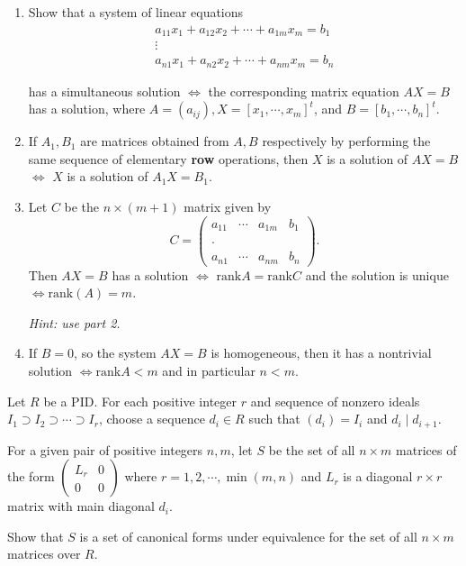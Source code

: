 \begin{problem}[Hungerford 7.2.4]
\label{prob:1.1}
\hfill
\begin{enumerate}
    \item Show that a system of linear equations
$$
\begin{array}{l}{
a_{11} x_{1}+a_{12} x_{2}+\cdots+a_{1 m} x_{m}=b_{1}} 
\\ 
\vdots 
\\ 
{a_{n 1} x_{1}+a_{n 2} x_{2}+\cdots+a_{n m} x_{m}=b_{n}}
\end{array}
$$

has a simultaneous solution $\iff$ the corresponding matrix equation $AX = B$ has a solution, where $A = (a_{ij}), X = [x_1, \cdots, x_m]^t$, and $B = [b_1, \cdots , b_n]^t$.

    \item If $A_1, B_1$ are matrices obtained from $A, B$ respectively by performing the same sequence of elementary \textbf{row} operations, then $X$ is a solution of $AX=B$ $\iff$ $X$ is a solution of $A_1 X = B_1$.
    
    \item Let $C$ be the $n \times (m+1)$ matrix given by 
    $$
    C = \left(\begin{array}{llll}{a_{11}} & {\cdots} & {a_{1 m}} & {b_{1}} \\ {} & {} & {} \\ {\cdot} & {} & {} \\ {a_{n 1}} & {\cdots} & {a_{n m}} & {b_{n}}\end{array}\right).
    $$
    Then $AX = B$ has a solution $\iff$ $\mathrm{rank} A = \mathrm{rank} C$ and the solution is unique $\iff \mathrm{rank}(A) = m$.
    
    \textit{Hint: use part 2.}
    
  \item If $B=0$, so the system $AX=B$ is homogeneous, then it has a nontrivial solution $\iff \mathrm{rank} A < m$ and in particular $n<m$.
\end{enumerate}

\end{problem}

\begin{problem}[Hungerford 7.2.5]
\label{prob:1.1}
Let $R$ be a PID. For each positive integer $r$ and sequence of nonzero ideals $I_1 \supset I_2 \supset \cdots \supset I_r$, choose a sequence $d_i \in R$ such that $(d_i) = I_i$ and $d_i \mid d_{i+1}$.

For a given pair of positive integers $n, m$, let $S$ be the set of all $n\times m$ matrices of the form $\left(\begin{array}{ll}{L_{r}} & {0} \\ {0} & {0}\end{array}\right)$ where $r=1,2,\cdots,\min(m,n)$ and $L_r$ is a diagonal $r\times r$ matrix with main diagonal $d_i$.

Show that $S$ is a set of canonical forms under equivalence for the set of all $n\times m$ matrices over $R$.
\end{problem}

